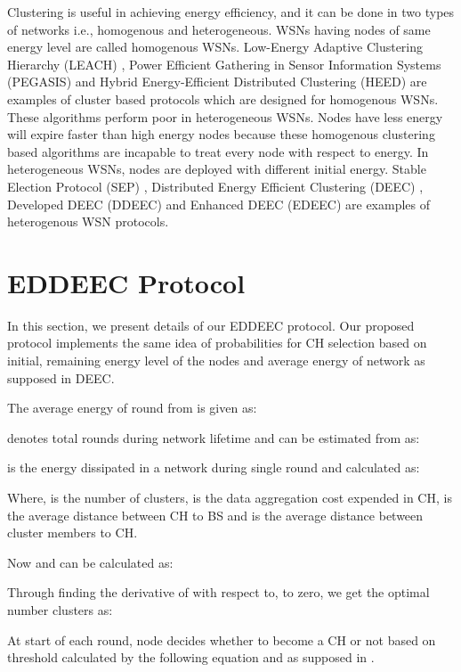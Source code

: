 \documentclass[3p,times,procedia]{elsarticle}
\begin{document}
Clustering is useful in achieving energy efficiency, and it can be done in two types of networks i.e., homogenous and heterogeneous. WSNs having nodes of same energy level are called homogenous WSNs. Low-Energy Adaptive Clustering Hierarchy (LEACH) \cite{Reference 5}, Power Efficient Gathering in Sensor Information Systems (PEGASIS) \cite{Reference 7} and Hybrid Energy-Efficient Distributed Clustering (HEED) \cite{Reference 8} are examples of cluster based protocols which are designed for homogenous WSNs. These algorithms perform poor in heterogeneous WSNs. Nodes have less energy will expire faster than high energy nodes because these homogenous clustering based algorithms are incapable to treat every node with respect to energy. In heterogeneous WSNs, nodes are deployed with different initial energy. Stable Election Protocol (SEP) \cite{Reference 9}, Distributed Energy Efficient Clustering (DEEC) \cite{Reference 10}, Developed DEEC (DDEEC) \cite{Reference 11} and Enhanced DEEC (EDEEC) \cite{Reference 12} are examples of heterogenous WSN protocols.

\section{EDDEEC Protocol}
In this section, we present details of our EDDEEC protocol. Our proposed protocol implements the same idea of probabilities for CH selection based on initial, remaining energy level of the nodes and average energy of network as supposed in DEEC.

The average energy of  round from \cite{Reference 10} is given as:



 denotes total rounds during network lifetime and can be estimated from \cite{Reference 10} as:



 is the energy dissipated in a network during single round and calculated as:



Where,  is the number of clusters,  is the data aggregation cost expended in CH,  is the average distance between CH to BS and  is the average distance between cluster members to CH.

Now  and  can be calculated as:



Through finding the derivative of  with respect to,  to zero, we get the  optimal number clusters as:



At start of each round, node decides whether to become a CH or not based on threshold calculated by the following equation and as supposed in \cite{Reference 5, Reference 10}.
\end{document}
